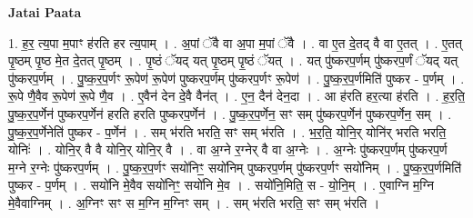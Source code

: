 \documentclass[17pt]{extarticle}
\begin{document}
\textbf{Jatai Paata} \newline

1. ह॒र॒ त्य॒पा म॒पाꣳ ह॑रति हर त्य॒पाम् । . अ॒पां ॅवै वा अ॒पा म॒पां ॅवै । . वा ए॒त दे॒तद् वै वा ए॒तत् । . ए॒तत् पृ॒ष्ठम् पृ॒ष्ठ मे॒त दे॒तत् पृ॒ष्ठम् । . पृ॒ष्ठं ॅयद् यत् पृ॒ष्ठम् पृ॒ष्ठं ॅयत् । . यत् पु॑ष्करप॒र्णम् पु॑ष्करप॒र्णं ॅयद् यत् पु॑ष्करप॒र्णम् । . पु॒ष्क॒र॒प॒र्णꣳ रू॒पेण॑ रू॒पेण॑ पुष्करप॒र्णम् पु॑ष्करप॒र्णꣳ रू॒पेण॑ । . पु॒ष्क॒र॒प॒र्णमिति॑ पुष्कर - प॒र्णम् । . रू॒पे णै॒वैव रू॒पेण॑ रू॒पे णै॒व । . ए॒वैन॑ देन दे॒वै वैन॑त् । . ए॒न॒ दैन॑ देन॒दा । . आ ह॑रति हर॒त्या ह॑रति । . ह॒र॒ति॒ पु॒ष्क॒र॒प॒र्णेन॑ पुष्करप॒र्णेन॑ हरति हरति पुष्करप॒र्णेन॑ । . पु॒ष्क॒र॒प॒र्णेन॒ सꣳ सम् पु॑ष्करप॒र्णेन॑ पुष्करप॒र्णेन॒ सम् । . पु॒ष्क॒र॒प॒र्णेनेति॑ पुष्कर - प॒र्णेन॑ । . सम् भ॑रति भरति॒ सꣳ सम् भ॑रति । . भ॒र॒ति॒ योनि॒र् योनि॑र् भरति भरति॒ योनिः॑ । . योनि॒र् वै वै योनि॒र् योनि॒र् वै । . वा अ॒ग्ने र॒ग्नेर् वै वा अ॒ग्नेः । . अ॒ग्नेः पु॑ष्करप॒र्णम् पु॑ष्करप॒र्ण म॒ग्ने र॒ग्नेः पु॑ष्करप॒र्णम् । . पु॒ष्क॒र॒प॒र्णꣳ सयो॑निꣳ॒॒ सयो॑निम् पुष्करप॒र्णम् पु॑ष्करप॒र्णꣳ सयो॑निम् । . पु॒ष्क॒र॒प॒र्णमिति॑ पुष्कर - प॒र्णम् । . सयो॑नि मे॒वैव सयो॑निꣳ॒॒ सयो॑नि मे॒व । . सयो॑नि॒मिति॒ स - यो॒नि॒म् । . ए॒वाग्नि म॒ग्नि मे॒वैवाग्निम् । . अ॒ग्निꣳ सꣳ स म॒ग्नि म॒ग्निꣳ सम् । . सम् भ॑रति भरति॒ सꣳ सम् भ॑रति । \newline
\end{document}
